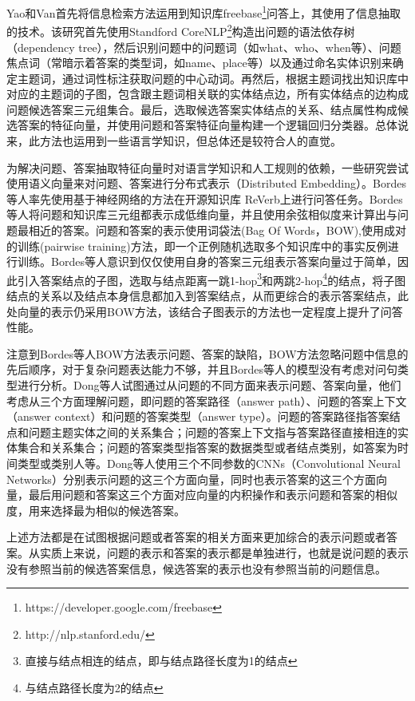 Yao和Van\cite{Yao}首先将信息检索方法运用到知识库freebase\footnote{https://developer.google.com/freebase}问答上，其使用了信息抽取的技术。该研究首先使用Standford CoreNLP\footnote{http://nlp.stanford.edu/}构造出问题的语法依存树（dependency tree），然后识别问题中的问题词（如what、who、when等）、问题焦点词（常暗示着答案的类型词，如name、place等）以及通过命名实体识别来确定主题词，通过词性标注获取问题的中心动词。再然后，根据主题词找出知识库中对应的主题词的子图，包含跟主题词相关联的实体结点边，所有实体结点的边构成问题候选答案三元组集合。最后，选取候选答案实体结点的关系、结点属性构成候选答案的特征向量，并使用问题和答案特征向量构建一个逻辑回归分类器。总体说来，此方法也运用到一些语言学知识，但总体还是较符合人的直觉。

为解决问题、答案抽取特征向量时对语言学知识和人工规则的依赖，一些研究尝试使用语义向量来对问题、答案进行分布式表示（Distributed Embedding）。Bordes\cite{Bordes3}等人率先使用基于神经网络的方法在开源知识库 ReVerb\cite{Fader}上进行问答任务。Bordes等人将问题和知识库三元组都表示成低维向量，并且使用余弦相似度来计算出与问题最相近的答案。问题和答案的表示使用词袋法(Bag Of Words，BOW),使用成对的训练(pairwise training)方法，即一个正例随机选取多个知识库中的事实反例进行训练。Bordes\cite{Bordes1}等人意识到仅仅使用自身的答案三元组表示答案向量过于简单，因此引入答案结点的子图，选取与结点距离一跳1-hop\footnote{直接与结点相连的结点，即与结点路径长度为1的结点}和两跳2-hop\footnote{与结点路径长度为2的结点}的结点，将子图结点的关系以及结点本身信息都加入到答案结点，从而更综合的表示答案结点，此处向量的表示仍采用BOW方法，该结合子图表示的方法也一定程度上提升了问答性能。

注意到Bordes等人BOW方法表示问题、答案的缺陷，BOW方法忽略问题中信息的先后顺序，对于复杂问题表达能力不够，并且Bordes等人的模型没有考虑对问句类型进行分析。Dong\cite{Dong}等人试图通过从问题的不同方面来表示问题、答案向量，他们考虑从三个方面理解问题，即问题的答案路径（answer path）、问题的答案上下文（answer context）和问题的答案类型（answer type）。问题的答案路径指答案结点和问题主题实体之间的关系集合；问题的答案上下文指与答案路径直接相连的实体集合和关系集合；问题的答案类型指答案的数据类型或者结点类别，如答案为时间类型或类别人等。Dong等人使用三个不同参数的CNNs（Convolutional Neural Networks）分别表示问题的这三个方面向量，同时也表示答案的这三个方面向量，最后用问题和答案这三个方面对应向量的内积操作和表示问题和答案的相似度，用来选择最为相似的候选答案。

上述方法都是在试图根据问题或者答案的相关方面来更加综合的表示问题或者答案。从实质上来说，问题的表示和答案的表示都是单独进行，也就是说问题的表示没有参照当前的候选答案信息，候选答案的表示也没有参照当前的问题信息。


